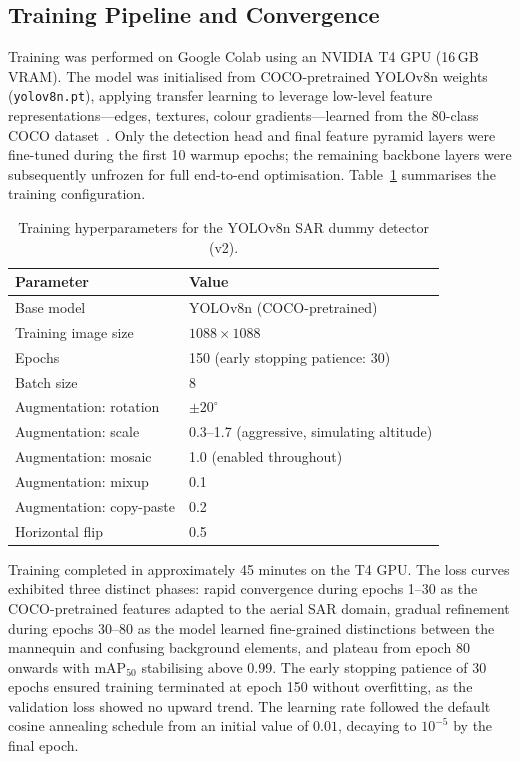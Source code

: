 \subsection{Training Pipeline and Convergence}\label{sec:training:pipeline}

Training was performed on Google Colab using an NVIDIA T4 GPU (16\,GB VRAM). The model was initialised from COCO-pretrained YOLOv8n weights (\texttt{yolov8n.pt}), applying transfer learning to leverage low-level feature representations---edges, textures, colour gradients---learned from the 80-class COCO dataset~\cite{lin2014coco, yolov8}. Only the detection head and final feature pyramid layers were fine-tuned during the first 10 warmup epochs; the remaining backbone layers were subsequently unfrozen for full end-to-end optimisation. Table~\ref{tab:training_config} summarises the training configuration.

\begin{table}[ht]
    \centering
    \caption{Training hyperparameters for the YOLOv8n SAR dummy detector (v2).}
    \label{tab:training_config}
    \begin{tabular}{@{}ll@{}}
        \toprule
        \textbf{Parameter} & \textbf{Value} \\
        \midrule
        Base model & YOLOv8n (COCO-pretrained) \\
        Training image size & $1088 \times 1088$ \\
        Epochs & 150 (early stopping patience: 30) \\
        Batch size & 8 \\
        Augmentation: rotation & $\pm20^{\circ}$ \\
        Augmentation: scale & 0.3--1.7 (aggressive, simulating altitude) \\
        Augmentation: mosaic & 1.0 (enabled throughout) \\
        Augmentation: mixup & 0.1 \\
        Augmentation: copy-paste & 0.2 \\
        Horizontal flip & 0.5 \\
        \bottomrule
    \end{tabular}
\end{table}

Training completed in approximately 45 minutes on the T4 GPU. The loss curves exhibited three distinct phases: rapid convergence during epochs 1--30 as the COCO-pretrained features adapted to the aerial SAR domain, gradual refinement during epochs 30--80 as the model learned fine-grained distinctions between the mannequin and confusing background elements, and plateau from epoch 80 onwards with mAP$_{50}$ stabilising above 0.99. The early stopping patience of 30 epochs ensured training terminated at epoch 150 without overfitting, as the validation loss showed no upward trend. The learning rate followed the default cosine annealing schedule from an initial value of $0.01$, decaying to $10^{-5}$ by the final epoch.

